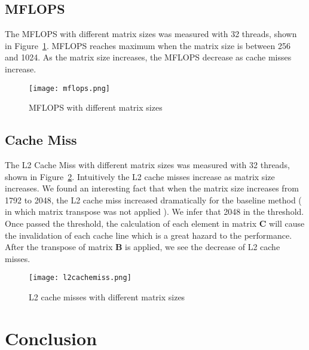 \documentclass[12pt]{article}
\begin{document}
\subsection{MFLOPS}
The MFLOPS with different matrix sizes was measured with 32 threads, shown in 
Figure~\ref{fig:mflops}. MFLOPS reaches maximum when the matrix size is between
256 and 1024. As the matrix size increases, the MFLOPS decrease as cache misses
increase.
\begin{figure}[h!]
	\begin{center}
		\texttt{[image: mflops.png]}
		\caption{\label{fig:mflops}MFLOPS with different matrix sizes}
	\end{center}
\end{figure}

\subsection{Cache Miss}
The L2 Cache Miss with different matrix sizes was measured with 32 threads, 
shown in Figure~\ref{fig:l2cachemiss}. Intuitively the L2 cache misses increase
as matrix size increases. We found an interesting fact that when the matrix size
increases from 1792 to 2048, the L2 cache miss increased dramatically for the 
baseline method ( in which matrix transpose was not applied ). We infer that 
2048 in the threshold. Once passed the threshold, the calculation of each element 
in matrix $\mathbf{C}$ will cause the invalidation of each cache line which is 
a great hazard to the performance. After the transpose of matrix $\mathbf{B}$ 
is applied, we see the decrease of L2 cache misses.

\begin{figure}[h!]
	\begin{center}
		\texttt{[image: l2cachemiss.png]}
		\caption{\label{fig:l2cachemiss}L2 cache misses with different matrix sizes}
	\end{center}
\end{figure}

\section{Conclusion}
\end{document}
